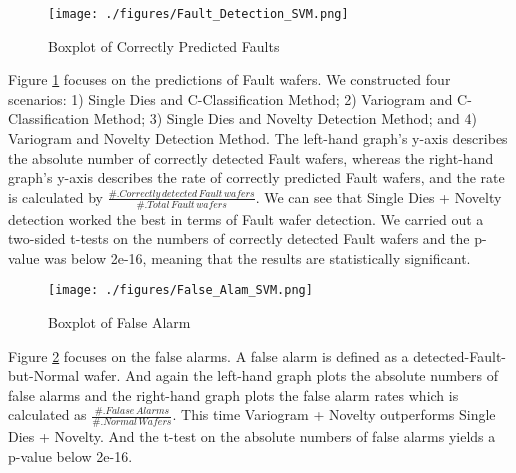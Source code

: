 \documentclass[english]{article}
\numberwithin{equation}{section}
\numberwithin{table}{section}
\numberwithin{figure}{section}
\begin{document}
\begin{figure}
\begin{centering}
\texttt{[image: ./figures/Fault\_Detection\_SVM.png]}
\par\end{centering}
\caption{Boxplot of Correctly Predicted Faults} \label{hh1}
\end{figure}


Figure \ref{hh1} focuses on the predictions of Fault wafers. We constructed
four scenarios: 1) Single Dies and C-Classification Method; 2) Variogram
and C-Classification Method; 3) Single Dies and Novelty Detection
Method; and 4) Variogram and Novelty Detection Method. The left-hand
graph's y-axis describes the absolute number of correctly detected
Fault wafers, whereas the right-hand graph's y-axis describes the
rate of correctly predicted Fault wafers, and the rate is calculated
by $\frac{\#.Correctly\, detected\, Fault\, wafers}{\#.Total\, Fault\, wafers}$.
We can see that Single Dies + Novelty detection worked the best in
terms of Fault wafer detection. We carried out a two-sided t-tests
on the numbers of correctly detected Fault wafers and the p-value
was below 2e-16, meaning that the results are statistically significant.


\begin{figure}
\begin{centering}
\texttt{[image: ./figures/False\_Alam\_SVM.png]}
\par\end{centering}
\caption{Boxplot of False Alarm} \label{hh2}
\end{figure}


Figure \ref{hh2} focuses on the false alarms. A false alarm is defined as
a detected-Fault-but-Normal wafer. And again the left-hand graph plots
the absolute numbers of false alarms and the right-hand graph plots
the false alarm rates which is calculated as $\frac{\#.Falase\, Alarms}{\#.Normal\, Wafers}$.
This time Variogram + Novelty outperforms Single Dies + Novelty. And
the t-test on the absolute numbers of false alarms yields a p-value
below 2e-16. 
\end{document}
